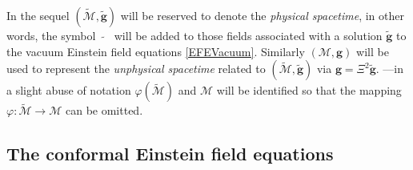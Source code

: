 \documentclass[10pt,a4paper]{article}
\theoremstyle{plain}
\def\bmg{{\bm g}}
\begin{document}
\medskip

In the sequel $(\tilde{\mathcal{M}},\tilde{\bmg})$ will be reserved to
denote the \emph{physical spacetime}, in other words, the symbol
$\tilde{ \quad}$ will be added to those fields associated with a
solution $\tilde{\bmg}$ to the vacuum Einstein field equations
\eqref{EFEVacuum}.  Similarly $(\mathcal{M},\bmg)$ will be used to
represent the \emph{unphysical spacetime} related to
$(\tilde{\mathcal{M}},\tilde{\bmg})$ via $\bmg=\Xi^2\tilde{\bmg}$.
---in a slight abuse of notation $\varphi(\tilde{\mathcal{M}})$ and
$\mathcal{M}$ will be identified so that the mapping $\varphi:
\tilde{\mathcal{M}}\rightarrow\mathcal{M}$ can be omitted.








\subsection{The  conformal Einstein field equations}
\label{Sec:CFEs}


 




\end{document}
